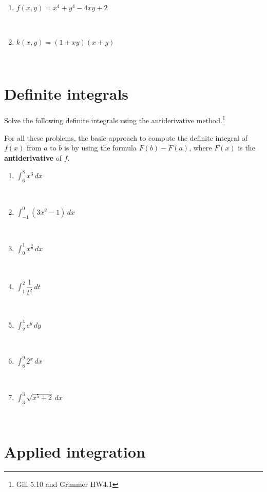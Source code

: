 \documentclass[
]{article}
\begin{document}
\begin{enumerate}
\def\labelenumi{\alph{enumi}.}
\item
  \(f(x,y) = x^4 + y^4 - 4xy + 2\)

  ~ ~ ~\\
\item
  \(k(x,y) = (1+xy)(x+y)\)

  ~\\
  \newpage
\end{enumerate}

\section{Definite integrals}\label{definite-integrals}

Solve the following definite integrals using the antiderivative
method.\footnote{Gill 5.10 and Grimmer HW4.1}

For all these problems, the basic approach to compute the definite
integral of \(f(x)\) from \(a\) to \(b\) is by using the formula
\(F(b) - F(a)\), where \(F(x)\) is the \textbf{antiderivative} of \(f\).

\begin{enumerate}
\def\labelenumi{\alph{enumi}.}
\item
  \(\int_6^8 x^3 \,dx\)

  ~\\
\item
  \(\int_{-1}^{0} (3x^2 -1) \,dx\)

  ~\\
\item
  \(\int_0^1 x^{\frac{3}{7}} \,dx\)

  ~\\
\item
  \(\int_1^2 \dfrac{1}{t^2} \,dt\)

  ~\\
\item
  \(\int_2^4 e^y \,dy\)

  ~\\
\item
  \(\int_8^9 2^x \,dx\)

  ~\\
\item
  \(\int_3^3 \sqrt{x^5 + 2} \,dx\)

  ~\\
  \newpage
\end{enumerate}

\section{Applied integration}\label{applied-integration}
\end{document}
